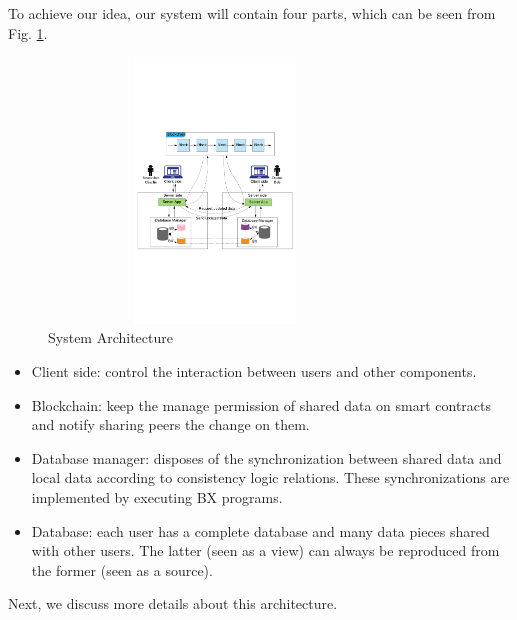 \documentclass[conference]{IEEEtran}
\begin{document}
To achieve our idea, our system will contain four parts, which can be seen from Fig. \ref{systemArchitecture}.

\begin{figure}[htbp]
    \centerline{\includegraphics[width=250pt,height=200pt]{systemArchitecture.pdf}}
    \caption{System Architecture}
    \label{systemArchitecture}
\end{figure}

\begin{itemize}
    \item Client side: control the interaction between users and other components.
    
    \item Blockchain: keep the manage permission of shared data on smart contracts and notify sharing peers the change on them.
     
    \item Database manager: disposes of the synchronization between shared data and local data according to consistency logic relations. These synchronizations are implemented by executing BX programs.
    
    \item Database: each user has a complete database and many data pieces shared with other users. The latter (seen as a view) can always be reproduced from the former (seen as a source).
    
\end{itemize}

Next, we discuss more details about this architecture.

\end{document}
